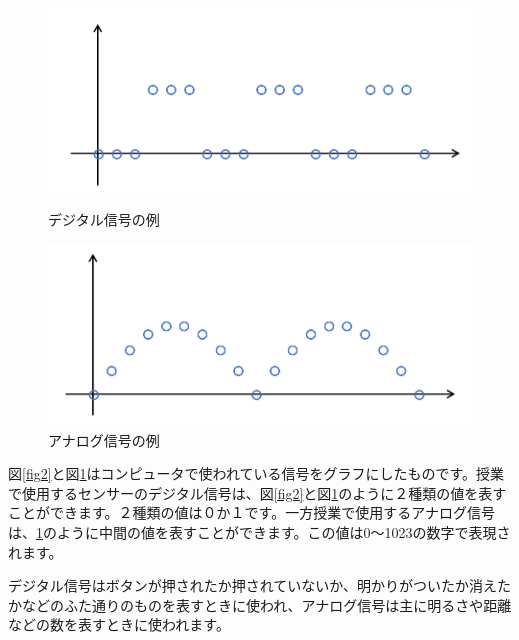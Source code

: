\begin{figure}[htbp]
  \begin{minipage}[b]{0.45\linewidth}
    \centering
    \includegraphics[keepaspectratio, scale=0.4]{images/chap05/text05-img002.png}
    \caption{デジタル信号の例}
    \label{fig2}
  \end{minipage}
  \begin{minipage}[b]{0.45\linewidth}
    \centering
    \includegraphics[keepaspectratio, scale=0.4]{images/chap05/text05-img003.png}
    \caption{アナログ信号の例}
    \label{fig3}
  \end{minipage}
\end{figure}

図\ref{fig2}と図\ref{fig3}はコンピュータで使われている信号をグラフにしたものです。授業で使用するセンサーのデジタル信号は、図\ref{fig2}と図\ref{fig3}のように２種類の値を表すことができます。２種類の値は０か１です。一方授業で使用するアナログ信号は、\ref{fig3}のように中間の値を表すことができます。この値は0〜1023の数字で表現されます。

デジタル信号はボタンが押されたか押されていないか、明かりがついたか消えたかなどのふた通りのものを表すときに使われ、アナログ信号は主に明るさや距離などの数を表すときに使われます。

\begin{tcolorbox}[title=\useOmetoi]
\begin{enumerate}
\end{enumerate}
\end{tcolorbox}
